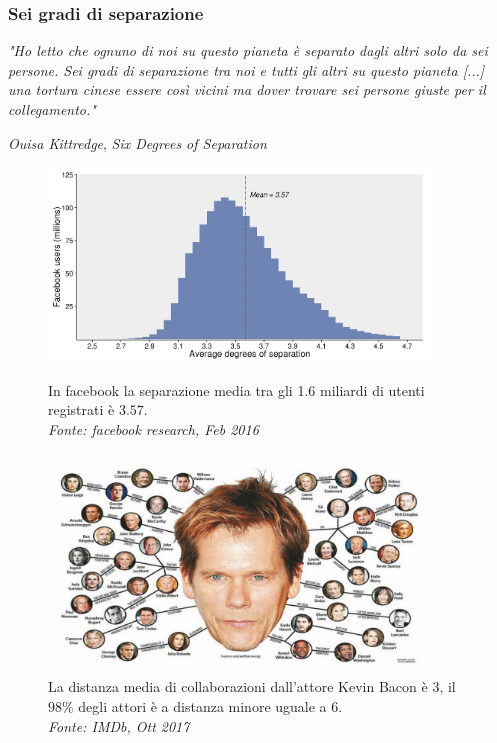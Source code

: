 \begin{frame}
	\frametitle{Sei gradi di separazione}
	\textit{"Ho letto che ognuno di noi su questo pianeta è separato dagli altri solo da sei persone. 
		Sei gradi di separazione tra noi e tutti gli altri su questo pianeta [...]\\ una tortura cinese essere così vicini ma dover trovare sei persone giuste per il collegamento."}
	\begin{flushright}
		\small \textit{Ouisa Kittredge}, \textit{Six Degrees of Separation}
	\end{flushright}

	
	\begin{figure}[h]
		\centering
		\begin{minipage}[t]{.49\textwidth}
			\centering
			\includegraphics[width=0.9\textwidth]{images/facebook}
			\caption{In facebook la separazione media tra gli 1.6 miliardi di utenti registrati è $3.57$.\\ \textit{Fonte: facebook research, Feb 2016}}
		\end{minipage}\hfill
		\begin{minipage}[t]{.49\textwidth}
			\centering
			\includegraphics[width=0.9\textwidth]{images/2_kevin_bacon}
			\caption{La distanza media di collaborazioni dall'attore Kevin Bacon è $3$, il $98\%$ degli attori è a distanza minore uguale a $6$.\\ \textit{Fonte: IMDb, Ott 2017}}
		\end{minipage}
	\end{figure}
	
\end{frame}

